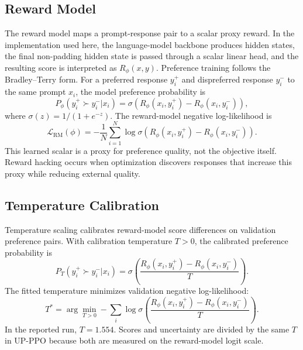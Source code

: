\documentclass[twocolumn,10pt]{article}
\newcommand{\Rphi}{R_{\phi}}
\begin{document}
\subsection{Reward Model}
The reward model maps a prompt-response pair to a scalar proxy reward. In the implementation used here, the language-model backbone produces hidden states, the final non-padding hidden state is passed through a scalar linear head, and the resulting score is interpreted as $\Rphi(x,y)$. Preference training follows the Bradley--Terry form. For a preferred response $y_i^+$ and dispreferred response $y_i^-$ to the same prompt $x_i$, the model preference probability is
\begin{equation}
    P_\phi(y_i^+ \succ y_i^-|x_i)
    =\sigma\left(\Rphi(x_i,y_i^+)-\Rphi(x_i,y_i^-)\right),
\end{equation}
where $\sigma(z)=1/(1+e^{-z})$. The reward-model negative log-likelihood is
\begin{equation}
    \mathcal{L}_{\mathrm{RM}}(\phi)
    =-\frac{1}{N}\sum_{i=1}^{N}
    \log \sigma\left(\Rphi(x_i,y_i^+)-\Rphi(x_i,y_i^-)\right).
\end{equation}
This learned scalar is a proxy for preference quality, not the objective itself. Reward hacking occurs when optimization discovers responses that increase this proxy while reducing external quality.

\subsection{Temperature Calibration}
Temperature scaling calibrates reward-model score differences on validation preference pairs. With calibration temperature $T>0$, the calibrated preference probability is
\begin{equation}
    P_T(y_i^+ \succ y_i^-|x_i)
    =\sigma\left(\frac{\Rphi(x_i,y_i^+)-\Rphi(x_i,y_i^-)}{T}\right).
\end{equation}
The fitted temperature minimizes validation negative log-likelihood:
\begin{equation}
    T^*=\arg\min_{T>0} -\sum_i
    \log \sigma\left(\frac{\Rphi(x_i,y_i^+)-\Rphi(x_i,y_i^-)}{T}\right).
\end{equation}
In the reported run, $T=1.554$. Scores and uncertainty are divided by the same $T$ in UP-PPO because both are measured on the reward-model logit scale.
\end{document}
